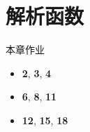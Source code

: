 \part{解析函数}


\begin{frame}[<*>]{本章作业}
\begin{itemize}
\item \textbf{2}, \textbf{3}, \textbf{4}
\item \textbf{6}, \textbf{8}, \textbf{11}
\item \textbf{12}, \textbf{15}, \textbf{18}
\end{itemize}
\end{frame}
